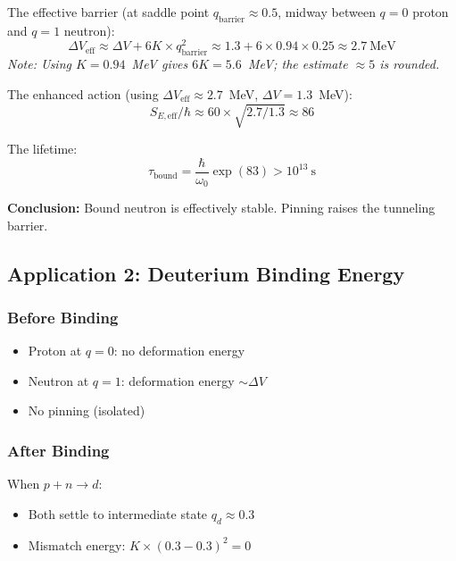 The effective barrier (at saddle point $q_{\text{barrier}} \approx 0.5$, midway between $q=0$ proton and $q=1$ neutron):
\begin{equation}
    \Delta V_{\text{eff}} \approx \Delta V + 6K \times q_{\text{barrier}}^2 \approx 1.3 + 6 \times 0.94 \times 0.25 \approx 2.7~\text{MeV}
\end{equation}
\emph{Note: Using $K = 0.94$~MeV gives $6K = 5.6$~MeV; the estimate $\approx 5$ is rounded.}

The enhanced action (using $\Delta V_{\text{eff}} \approx 2.7$~MeV, $\Delta V = 1.3$~MeV):
\begin{equation}
    S_{E,\text{eff}}/\hbar \approx 60 \times \sqrt{2.7/1.3} \approx 86
\end{equation}

The lifetime:
\begin{equation}
    \tau_{\text{bound}} = \frac{\hbar}{\omega_0} \exp(83) > 10^{13}~\text{s}
\end{equation}

\textbf{Conclusion:} Bound neutron is effectively stable. Pinning raises the tunneling barrier.

\subsection{Application 2: Deuterium Binding Energy}
\label{subsec:m6-deuterium}

\subsubsection{Before Binding}

\begin{itemize}
    \item Proton at $q = 0$: no deformation energy
    \item Neutron at $q = 1$: deformation energy $\sim \Delta V$
    \item No pinning (isolated)
\end{itemize}

\subsubsection{After Binding}

When $p + n \to d$:
\begin{itemize}
    \item Both settle to intermediate state $q_d \approx 0.3$
    \item Mismatch energy: $K \times (0.3 - 0.3)^2 = 0$
\end{itemize}

